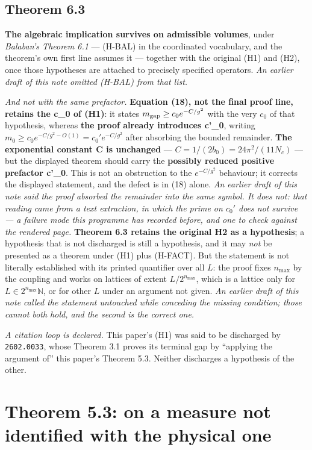 \documentclass[11pt]{article}
\begin{document}
\subsection{Theorem 6.3}

\textbf{The algebraic implication survives on admissible volumes}, under
\emph{Balaban's Theorem 6.1} --- (H-BAL) in the coordinated vocabulary, and the
theorem's own first line assumes it --- together with the original (H1) and (H2), once
those hypotheses are attached to precisely specified operators. \emph{An earlier draft
of this note omitted (H-BAL) from that list.}

\emph{And not with the same prefactor.} \textbf{Equation (18), not the final proof
line, retains the c\_0 of (H1)}: it states $m_{\rm gap}\ge c_0e^{-C/g^2}$ with the very
$c_0$ of that hypothesis, whereas \textbf{the proof already introduces c'\_0}, writing
$m_0\ge c_0e^{-C/g^2-O(1)}=c_0'e^{-C/g^2}$ after absorbing the bounded remainder.
\textbf{The exponential constant C is unchanged} --- $C=1/(2b_0)=24\pi^2/(11N_c)$ ---
but the displayed theorem should carry the \textbf{possibly reduced positive prefactor
c'\_0}. This is not an obstruction to the $e^{-C/g^2}$ behaviour; it corrects the
displayed statement, and the defect is in (18) alone. \emph{An earlier draft of this
note said the proof absorbed the remainder into the same symbol. It does not: that
reading came from a text extraction, in which the prime on $c_0'$ does not survive ---
a failure mode this programme has recorded before, and one to check against the
rendered page.}
\textbf{Theorem 6.3 retains the original H2 as a hypothesis}; a hypothesis that is not
discharged is still a hypothesis, and it may \emph{not} be presented as a theorem under
(H1) plus (H-FACT). But the statement is not literally established with its printed
quantifier over all $L$: the proof fixes $n_{\max}$ by the coupling and works on
lattices of extent $L/2^{n_{\max}}$, which is a lattice only for $L\in2^{n_{\max}}
\mathbb N$, or for other $L$ under an argument not given. \emph{An earlier draft of this
note called the statement untouched while conceding the missing condition; those cannot
both hold, and the second is the correct one.}

\emph{A citation loop is declared.} This paper's (H1) was said to be discharged by
\texttt{2602.0033}, whose Theorem 3.1 proves its terminal gap by ``applying the argument
of'' this paper's Theorem 5.3. Neither discharges a hypothesis of the other.

\section{Theorem 5.3: on a measure not identified with the physical one}
\end{document}
